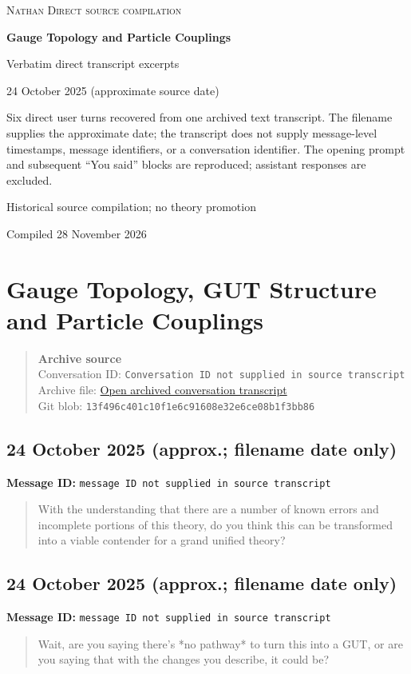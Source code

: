 \documentclass[11pt,letterpaper]{article}
\newcommand{\messageentry}[3]{%
  \Needspace{7\baselineskip}
  \subsection*{#1}
  {\small\textbf{Message ID:} \texttt{#2}}
  \vspace{2pt}
}
\newcommand{\sourceblock}[4]{%
  \begin{quote}\small
  \textbf{#1}\\
  Conversation ID: \texttt{#2}\\
  Archive file: \href{#3}{Open archived conversation transcript}\\
  Git blob: \texttt{#4}
  \end{quote}
}
\begin{document}
\begin{titlepage}
\centering
\vspace*{1.15in}
{\Large\textsc{Nathan Direct source compilation}\par}
\vspace{0.45in}
{\huge\bfseries Gauge Topology and Particle Couplings\par}
\vspace{0.22in}
{\large Verbatim direct transcript excerpts\par}
\vspace{0.7in}
{\large 24 October 2025 (approximate source date)\par}
\vfill
\begin{minipage}{0.84\textwidth}
\small
Six direct user turns recovered from one archived text transcript. The filename supplies the approximate date; the transcript does not supply message-level timestamps, message identifiers, or a conversation identifier. The opening prompt and subsequent ``You said'' blocks are reproduced; assistant responses are excluded.
\end{minipage}
\vfill
{\small Historical source compilation; no theory promotion\par}
{\small Compiled 28 November 2026\par}
\end{titlepage}
\section*{Gauge Topology, GUT Structure and Particle Couplings}
\sourceblock{Archive source}{Conversation ID not supplied in source transcript}{https://github.com/Satobloc/SAT_THEORY_ARCHIVE_2023-25/blob/main/EARLY\%20LOGGED/2025-10-24_theory\%20type.txt\%EF\%80\%8A\%EF\%80\%8AThought\%20for\%2023\%20se.txt}{13f496c4\hspace{0pt}01c10f1e\hspace{0pt}6c91608e\hspace{0pt}32e6ce08\hspace{0pt}b1f3bb86}
\messageentry{24 October 2025 (approx.; filename date only)}{message ID not supplied in source transcript}{}
\begin{quote}\small
With the understanding that there are a number of known errors and incomplete portions of this theory, do you think this can be transformed into a viable contender for a grand unified theory?
\end{quote}

\messageentry{24 October 2025 (approx.; filename date only)}{message ID not supplied in source transcript}{}
\begin{quote}\small
Wait, are you saying there’s *no pathway* to turn this into a GUT, or are you saying that with the changes you describe, it could be?
\end{quote}
\end{document}

